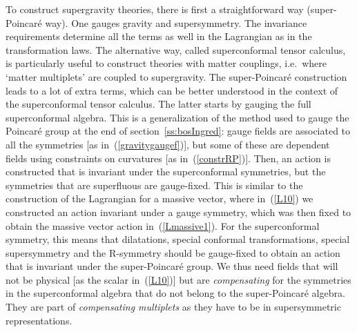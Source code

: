 \documentclass[a4paper,11pt,twoside]{article}
\begin{document}
To construct supergravity theories, there is first a straightforward way
(super-Poincar{\'e} way). One gauges gravity and supersymmetry. The
invariance requirements determine all the terms as well in the Lagrangian
as in the transformation laws. The alternative way, called superconformal
tensor calculus, is particularly useful to construct theories with matter
couplings, i.e.\ where `matter multiplets' are coupled to supergravity.
The super-Poincar{\'e} construction leads to a lot of extra terms, which can
be better understood in the context of the superconformal tensor
calculus. The latter starts by gauging the full superconformal algebra.
This is a generalization of the method used to gauge the Poincar{\'e} group
at the end of section~\ref{ss:bosIngred}: gauge fields are associated to
all the symmetries [as in~(\ref{gravitygaugef})], but some of these are
dependent fields using constraints on curvatures [as
in~(\ref{constrRP})]. Then, an action is constructed that is invariant
under the superconformal symmetries, but the symmetries that are
superfluous are gauge-fixed. This is similar to the construction of the
Lagrangian for a massive vector, where in~(\ref{L10}) we constructed an
action invariant under a gauge symmetry, which was then fixed to obtain
the massive vector action in~(\ref{Lmassive1}). For the superconformal
symmetry, this means that dilatations, special conformal transformations,
special supersymmetry and the R-symmetry should be gauge-fixed to obtain
an action that is invariant under the super-Poincar{\'e} group. We thus need
fields that will not be physical [as the scalar \myHighlight{$\phi $}\coordHE{} in~(\ref{L10})]
but are \emph{compensating} for the symmetries in the superconformal
algebra that do not belong to the super-Poincar{\'e} algebra. They are part
of \emph{compensating multiplets} as they have to be in supersymmetric
representations.
\end{document}
